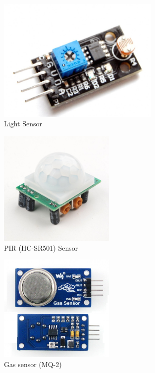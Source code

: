 \begin{figure}
	\centering
	\includegraphics[width=0.7\textwidth,natwidth=719,natheight=552]{Figures/Sensors&Rasp/light.png}
	\caption[light]{Light Sensor}
	\label{fig:light}
\end{figure}
\begin{figure}
	\centering
	\includegraphics[width=0.5\textwidth,natwidth=1000,natheight=1000]{Figures/Sensors&Rasp/pir.jpg}
	\caption[pir]{PIR (HC-SR501) Sensor}
	\label{fig:HC-SR501}
\end{figure}
\begin{figure}
	\centering
	\includegraphics[width=0.5\textwidth,natwidth=677,natheight=629]{Figures/Sensors&Rasp/mq-2.png}
	\caption[gas]{Gas sensor (MQ-2)}
	\label{fig:MQ-2}
\end{figure}




